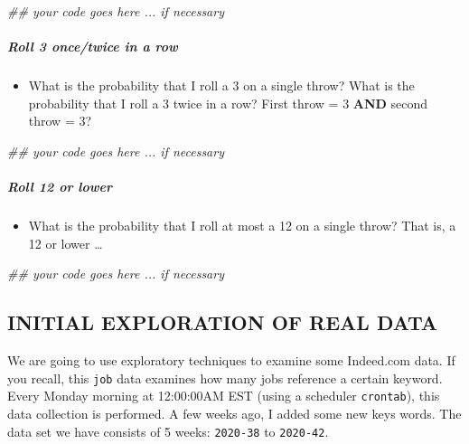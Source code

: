 \documentclass[
]{article}
\newenvironment{Shaded}{\begin{snugshade}}{\end{snugshade}}
\newcommand{\CommentTok}[1]{\textcolor[rgb]{0.56,0.35,0.01}{\textit{#1}}}
\providecommand{\tightlist}{%
  \setlength{\itemsep}{0pt}\setlength{\parskip}{0pt}}
\begin{document}
\begin{Shaded}
\begin{Highlighting}[]
\CommentTok{\#\# your code goes here ... if necessary}
\end{Highlighting}
\end{Shaded}

\hypertarget{roll-3-oncetwice-in-a-row}{%
\subparagraph{\texorpdfstring{\textbf{Roll 3 once/twice in a
row}}{Roll 3 once/twice in a row}}\label{roll-3-oncetwice-in-a-row}}

\begin{itemize}
\tightlist
\item
  What is the probability that I roll a 3 on a single throw? What is the
  probability that I roll a 3 twice in a row? First throw = 3
  \textbf{AND} second throw = 3?
\end{itemize}

\begin{Shaded}
\begin{Highlighting}[]
\CommentTok{\#\# your code goes here ... if necessary}
\end{Highlighting}
\end{Shaded}

\hypertarget{roll-12-or-lower}{%
\subparagraph{\texorpdfstring{\textbf{Roll 12 or
lower}}{Roll 12 or lower}}\label{roll-12-or-lower}}

\begin{itemize}
\tightlist
\item
  What is the probability that I roll at most a 12 on a single throw?
  That is, a 12 or lower \ldots{}
\end{itemize}

\begin{Shaded}
\begin{Highlighting}[]
\CommentTok{\#\# your code goes here ... if necessary}
\end{Highlighting}
\end{Shaded}

\hypertarget{initial-exploration-of-real-data}{%
\subsection{INITIAL EXPLORATION OF REAL
DATA}\label{initial-exploration-of-real-data}}

We are going to use exploratory techniques to examine some Indeed.com
data. If you recall, this \texttt{job} data examines how many jobs
reference a certain keyword. Every Monday morning at 12:00:00AM EST
(using a scheduler \texttt{crontab}), this data collection is performed.
A few weeks ago, I added some new keys words. The data set we have
consists of 5 weeks: \texttt{2020-38} to \texttt{2020-42}.
\end{document}
